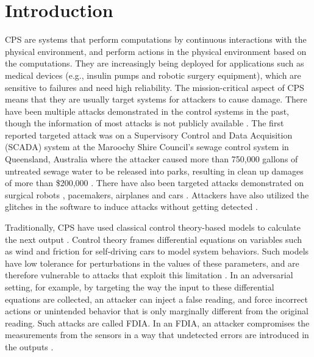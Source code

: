
\chapter{Introduction }
\label{ch:Chapter1}
\ac{CPS} are systems that perform computations by continuous interactions with the physical environment, and perform actions in the physical environment based on the computations.   
They are increasingly being deployed for applications \cite{10.1145/2038642.2038685}\cite{10.1145/1837274.1837463} \cite{6051465} such as medical devices (e.g., insulin pumps and robotic surgery equipment), which are sensitive to failures and need high reliability. 
The mission-critical aspect of \ac{CPS} means that they are usually target systems for attackers to cause damage. 
There have been multiple attacks demonstrated in the control systems in the past, though the information of most attacks is not publicly available \cite{doi:10.1080/13518040590969785}.
The first reported targeted attack was on a Supervisory Control and Data Acquisition (SCADA) system \cite{article22} at the Maroochy Shire Council’s sewage control system in Queensland, Australia where the attacker caused more than 750,000 gallons of untreated sewage water to be released into parks, resulting in clean up damages of more than \$200,000 \cite{10.1016/j.adhoc.2009.04.012}.
There have also been targeted attacks demonstrated on surgical robots \cite{7579758}, pacemakers\cite{4531149}, airplanes \cite{217595} and  cars \cite{10.5555/1929820.1929848}.
Attackers have also utilized the glitches in the software to induce attacks without getting detected \cite{242054}. 


Traditionally, \ac{CPS} have used classical control theory-based models  \cite{1337806} \cite{10.1145/2038642.2038667} \cite{6051465} to calculate the next output . 
Control theory frames differential equations on variables such as wind and friction for self-driving cars to model system behaviors. 
Such models have low tolerance for perturbations in the values of these parameters, and are therefore vulnerable to attacks that exploit this limitation \cite{10.1145/1952982.1952995}. 
In an adversarial setting, for example, by targeting the way the input to these differential equations are collected, an attacker can inject a false reading, and force incorrect actions or unintended behavior that is only marginally different from the original reading. 
Such attacks are called \ac{FDIA}. In an \ac{FDIA}, an attacker compromises the measurements from the sensors in a way that undetected errors are introduced in the outputs \cite{7438916}. 


